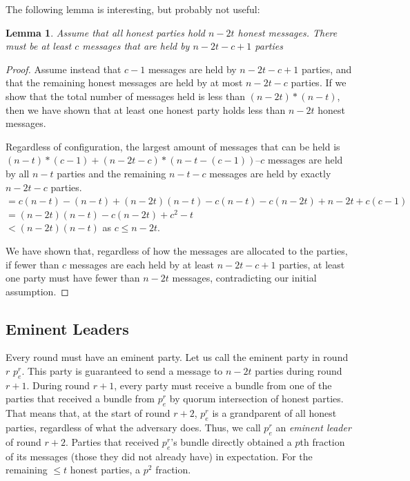 \documentclass{article}
\newtheorem{lemma}{Lemma}
\begin{document}
The following lemma is interesting, but probably not useful:

\begin{lemma}
Assume that all honest parties hold $n-2t$ honest messages. There must be at least $c$ messages that are held by $n - 2t - c + 1$ parties
\end{lemma}

\begin{proof}
Assume instead that $c - 1$ messages are held by $n - 2t - c + 1$ parties, and that the remaining honest messages are held by at most $n - 2t - c$ parties. If we show that the total number of messages held is less than $(n - 2t)*(n - t)$, then we have shown that at least one honest party holds less than $n - 2t$ honest messages. 

Regardless of configuration, the largest amount of messages that can be held is $(n - t) * (c-1) + (n - 2t - c) * (n - t - (c-1))$--$c$ messages are held by all $n - t$ parties and the remaining $n -t - c$ messages are held by exactly $n - 2t - c$ parties. \\
$= c(n - t)  -  (n - t) + (n - 2t)(n - t) - c(n - t) - c(n - 2t) + n - 2t + c(c-1)$\\
$= (n - 2t)(n - t) - c(n - 2t) + c^2 - t$\\
$< (n - 2t)(n - t)$ as $c \leq n - 2t$.

We have shown that, regardless of how the messages are allocated to the parties, if fewer than $c$ messages are each held by at least $n - 2t - c + 1$ parties, at least one party must have fewer than $n - 2t$ messages, contradicting our initial assumption.
\end{proof}

\subsection{Eminent Leaders}
Every round must have an eminent party. Let us call the eminent party in round $r$ $p_e^r$. This party is guaranteed to send a message to $n - 2t$ parties during round $r+1$. During round $r+1$, every party must receive a bundle from one of the parties that received a bundle from $p_e^r$ by quorum intersection of honest parties. That means that, at the start of round $r+2$, $p_e^r$ is a grandparent of all honest parties, regardless of what the adversary does. Thus, we call $p_e^r$ an \emph{eminent leader} of round $r+2$. Parties that received $p_e^r$'s bundle directly obtained a $p$th fraction of its messages (those they did not already have) in expectation. For the remaining $ \leq t$ honest parties, a $p^2$ fraction. 
\end{document}
